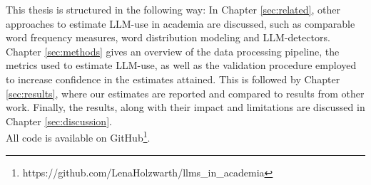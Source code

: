 This thesis is structured in the following way: In Chapter \ref{sec:related}, other approaches to estimate LLM-use in academia are discussed, such as comparable word frequency measures, word distribution modeling and LLM-detectors.
Chapter \ref{sec:methods} gives an overview of the data processing pipeline, the metrics used to estimate LLM-use, as well as the validation procedure employed to increase confidence in the estimates attained.
This is followed by Chapter \ref{sec:results}, where our estimates are reported and compared to results from other work.
Finally, the results, along with their impact and limitations are discussed in Chapter \ref{sec:discussion}.
\\
All code is available on GitHub\footnote{https://github.com/LenaHolzwarth/llms\_in\_academia}.
